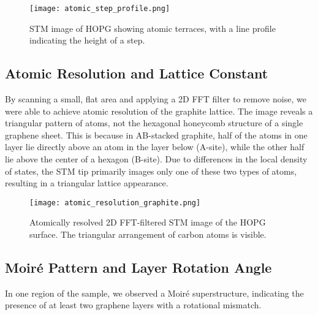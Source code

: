 \documentclass[12pt,a4paper]{article}
\begin{document}
\begin{figure}[H]
    \centering
    \texttt{[image: atomic\_step\_profile.png]}
    \caption{STM image of HOPG showing atomic terraces, with a line profile indicating the height of a step.}
    \label{fig:step}
\end{figure}


\subsection{Atomic Resolution and Lattice Constant}
By scanning a small, flat area and applying a 2D FFT filter to remove noise, we were able to achieve atomic resolution of the graphite lattice. The image reveals a triangular pattern of atoms, not the hexagonal honeycomb structure of a single graphene sheet. This is because in AB-stacked graphite, half of the atoms in one layer lie directly above an atom in the layer below (A-site), while the other half lie above the center of a hexagon (B-site). Due to differences in the local density of states, the STM tip primarily images only one of these two types of atoms, resulting in a triangular lattice appearance.

\begin{figure}[H]
    \centering
    \texttt{[image: atomic\_resolution\_graphite.png]}
    \caption{Atomically resolved 2D FFT-filtered STM image of the HOPG surface. The triangular arrangement of carbon atoms is visible.}
    \label{fig:atomic-res}
\end{figure}


\subsection{Moiré Pattern and Layer Rotation Angle}
In one region of the sample, we observed a Moiré superstructure, indicating the presence of at least two graphene layers with a rotational mismatch.
\end{document}
